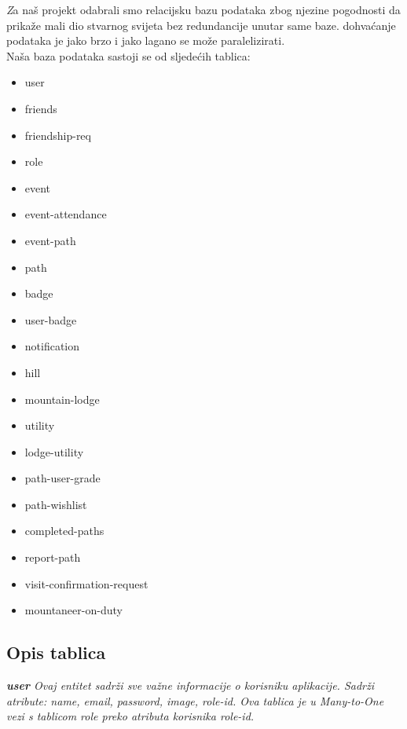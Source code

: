 		\textit Za naš projekt odabrali smo relacijsku bazu podataka zbog njezine pogodnosti da prikaže mali dio stvarnog svijeta bez redundancije unutar same baze. dohvaćanje podataka je jako brzo i jako lagano se može paralelizirati. \\
Naša baza podataka sastoji se od sljedećih tablica:
\begin{itemize}

\item
	user
\item
	friends
\item
	friendship-req
\item
	role
\item
	event
\item
	event-attendance
\item
	event-path
\item
	path
\item
	badge
\item
	user-badge
\item
	notification
\item
	hill
\item
	mountain-lodge
\item
	utility
\item
	lodge-utility
\item
	path-user-grade
\item
	path-wishlist
\item
	completed-paths
\item
	report-path
\item
	visit-confirmation-request
\item
	mountaneer-on-duty
	


\end{itemize}
		
			\subsection{Opis tablica}
			
			\textit{\textbf{user}  Ovaj entitet sadrži sve važne informacije o korisniku aplikacije. Sadrži atribute: name, email, password, image, role-id.  Ova tablica je u Many-to-One vezi s tablicom role preko atributa korisnika role-id.}
			
